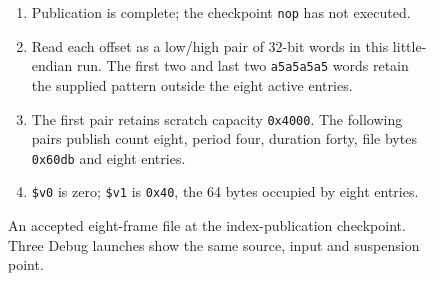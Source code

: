 \begin{figure}[htbp]
  \par\smallskip
  \begin{minipage}{\linewidth}
    \small
    \begin{enumerate}
      \item Publication is complete; the checkpoint \texttt{nop} has not executed.
      \item Read each offset as a low/high pair of 32-bit words in this little-endian run. The first two and last two \texttt{a5a5a5a5} words retain the supplied pattern outside the eight active entries.
      \item The first pair retains scratch capacity \texttt{0x4000}. The following pairs publish count eight, period four, duration forty, file bytes \texttt{0x60db} and eight entries.
      \item \texttt{\$v0} is zero; \texttt{\$v1} is \texttt{0x40}, the 64 bytes occupied by eight entries.
    \end{enumerate}
  \end{minipage}
  \caption{An accepted eight-frame file at the index-publication checkpoint. Three Debug launches show the same source, input and suspension point.}
  \label{fig:video-index-publication}
\end{figure}
